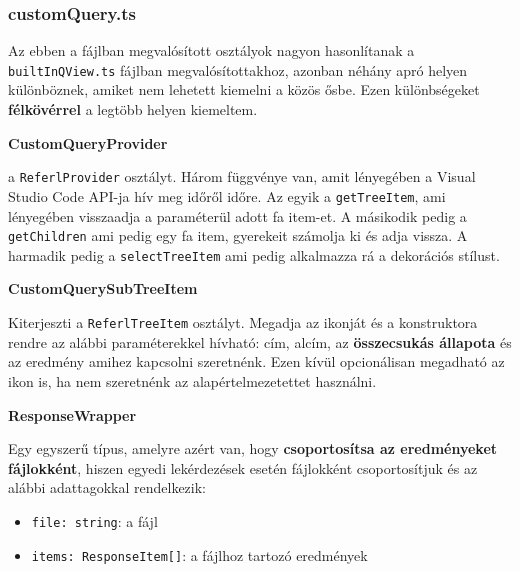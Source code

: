 \subsubsection{customQuery.ts}

Az ebben a fájlban megvalósított osztályok nagyon hasonlítanak a \lstinline{builtInQView.ts} fájlban megvalósítottakhoz, azonban néhány apró helyen különböznek, amiket nem lehetett kiemelni a közös ősbe. Ezen különbségeket \textbf{félkövérrel} a legtöbb helyen kiemeltem.



\vspace{14pt}
\noindent \textbf{CustomQueryProvider}


\noindentKiterjeszti a \lstinline{ReferlProvider} osztályt. Három függvénye van, amit lényegében a Visual Studio Code API-ja hív meg időről időre. Az egyik a \lstinline{getTreeItem}, ami lényegében visszaadja a paraméterül adott fa item-et. A másikodik pedig a \lstinline{getChildren} ami pedig egy fa item, gyerekeit számolja ki és adja vissza. A harmadik pedig a \lstinline{selectTreeItem} ami pedig alkalmazza rá a dekorációs stílust.






\vspace{14pt}
\noindent \textbf{CustomQuerySubTreeItem}


\noindent Kiterjeszti a \lstinline{ReferlTreeItem} osztályt. Megadja az ikonját és a konstruktora rendre az alábbi paraméterekkel hívható: cím, alcím, az \textbf{összecsukás állapota} és az eredmény amihez kapcsolni szeretnénk. Ezen kívül opcionálisan megadható az ikon is, ha nem szeretnénk az alapértelmezetettet használni.



\newpage


\vspace{14pt}
\noindent \textbf{ResponseWrapper}


\noindent Egy egyszerű típus, amelyre azért van, hogy \textbf{csoportosítsa az eredményeket fájlokként}, hiszen egyedi lekérdezések esetén fájlokként csoportosítjuk és az alábbi adattagokkal rendelkezik:

\begin{itemize}
    \item \lstinline{file: string}: a fájl
    
    \item \lstinline{items: ResponseItem[]}: a fájlhoz tartozó eredmények

\end{itemize}







